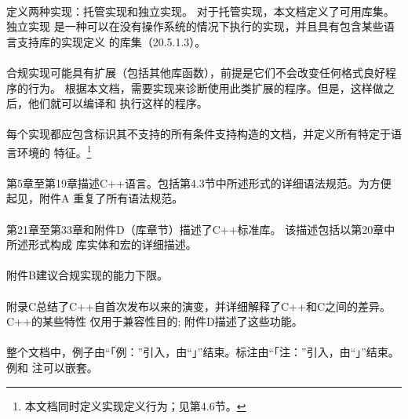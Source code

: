 \paragraph{}
定义两种实现：托管实现和独立实现。 对于托管实现，本文档定义了可用库集。 独立实现
是一种可以在没有操作系统的情况下执行的实现，并且具有包含某些语言支持库的实现定义
的库集（20.5.1.3）。

\paragraph{}
合规实现可能具有扩展（包括其他库函数），前提是它们不会改变任何格式良好程序的行为。
根据本文档，需要实现来诊断使用此类扩展的程序。但是，这样做之后，他们就可以编译和
执行这样的程序。

\paragraph{}
每个实现都应包含标识其不支持的所有条件支持构造的文档，并定义所有特定于语言环境的
特征。\footnote{本文档同时定义实现定义行为；见第4.6节。}

\paragraph{}
第5章至第19章描述C++语言。包括第4.3节中所述形式的详细语法规范。为方便起见，附件A
重复了所有语法规范。

\paragraph{}
第21章至第33章和附件D（库章节）描述了C++标准库。 该描述包括以第20章中所述形式构成
库实体和宏的详细描述。 

\paragraph{}
附件B建议合规实现的能力下限。

\paragraph{}
附录C总结了C++自首次发布以来的演变，并详细解释了C++和C之间的差异。C++的某些特性
仅用于兼容性目的; 附件D描述了这些功能。

\paragraph{}
整个文档中，例子由“「例：”引入，由“」”结束。标注由“「注：”引入，由“」”结束。例和
注可以嵌套。

